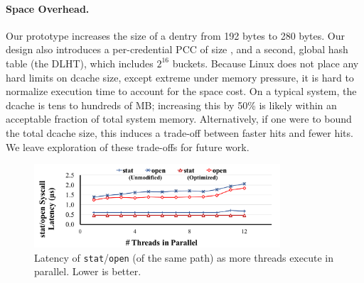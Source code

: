 
\paragraph{Space Overhead.}
Our prototype increases the size of a dentry from 192 bytes to 280 bytes.
Our design also introduces a per-credential PCC of size \PCCsize{}, 
and a second, global hash table (the DLHT),
which includes $2^{16}$ buckets.
Because Linux does not place any hard limits on dcache size, except extreme under memory pressure, 
it is hard to normalize execution time to account for the space cost.
On a typical system, the dcache is tens to hundreds of MB; increasing this by 50\% is likely within an acceptable 
fraction of total system memory.
Alternatively, if one were to bound the total dcache size, this induces
a trade-off between faster hits and fewer hits.  
We leave exploration of these trade-offs for future work.


\begin{figure}[t!]
\scriptsize
\centering
\includegraphics[width=3.6in]{dcache/plots/stat-open-scal.pdf}
\vspace{-5pt}
\caption[Latency of {\tt stat}/{\tt open} as more threads execute in parallel.]
{Latency of {\tt stat}/{\tt open} (of the same path) as more threads execute in parallel.  Lower is better.}
\label{fig:scalability}
\end{figure}



